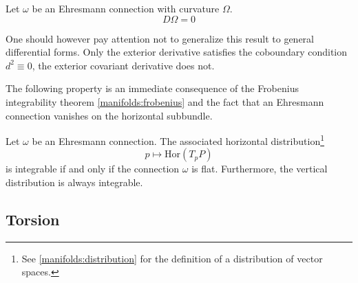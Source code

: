 	\begin{property}
		Let $\omega$ be an Ehresmann connection with curvature $\Omega$.
		\begin{equation}
			\boxed{D\Omega = 0}
		\end{equation}
	\end{property}
	\begin{remark}
		One should however pay attention not to generalize this result to general differential forms. \mnote{\dbend} Only the exterior derivative satisfies the coboundary condition $d^2 \equiv 0$, the exterior covariant derivative does not.
	\end{remark}
	
	
	The following property is an immediate consequence of the Frobenius integrability theorem \ref{manifolds:frobenius} and the fact that an Ehresmann connection vanishes on the horizontal subbundle.
	\begin{property}
		Let $\omega$ be an Ehresmann connection. The associated horizontal distribution\footnote{See \ref{manifolds:distribution} for the definition of a distribution of vector spaces.}\[p\mapsto\text{Hor}(T_pP)\]is integrable if and only if the connection $\omega$ is flat. Furthermore, the vertical distribution is always integrable.
	\end{property}
	
	
\subsection{Torsion}

	
